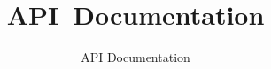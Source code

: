 \documentclass{article}
\begin{document}



\title{API~Documentation}
\author{API Documentation}
\maketitle


\addtolength{\parskip}{-2ex}
\tableofcontents
\addtolength{\parskip}{2ex}

\end{document}
